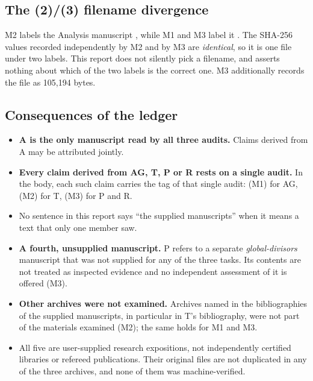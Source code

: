 \documentclass[11pt,letterpaper]{article}
\numberwithin{equation}{section}
\theoremstyle{definition}
\theoremstyle{remark}
\begin{document}
\subsection*{The \texorpdfstring{(2)}{(2)}/\texorpdfstring{(3)}{(3)} filename divergence}
M2 labels the Analysis manuscript , while M1
and M3 label it . The SHA-256 values recorded
independently by M2 and by M3 are \emph{identical}, so it is one file under two
labels. This report does not silently pick a filename, and asserts nothing about
which of the two labels is the correct one. M3 additionally records the file as
105{,}194 bytes.

\subsection*{Consequences of the ledger}
\begin{itemize}
\item \textbf{A is the only manuscript read by all three audits.} Claims derived
from A may be attributed jointly.
\item \textbf{Every claim derived from AG, T, P or R rests on a single audit.} In
the body, each such claim carries the tag of that single audit: (M1) for AG,
(M2) for T, (M3) for P and R.
\item No sentence in this report says ``the supplied manuscripts'' when it means
a text that only one member saw.
\item \textbf{A fourth, unsupplied manuscript.} P refers to a separate
\emph{global-divisors} manuscript that was not supplied for any of the three
tasks. Its contents are not treated as inspected evidence and no independent
assessment of it is offered (M3).
\item \textbf{Other archives were not examined.} Archives named in the
bibliographies of the supplied manuscripts, in particular in T's bibliography,
were not part of the materials examined (M2); the same holds for M1 and M3.
\item All five are user-supplied research expositions, not independently
certified libraries or refereed publications. Their original files are not
duplicated in any of the three archives, and none of them was machine-verified.
\end{itemize}
\end{document}
